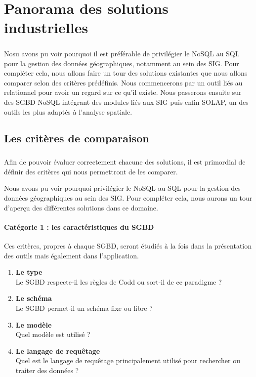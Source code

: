 \chapter{Panorama des solutions industrielles}
\paragraph{}Nosu avons pu voir pourquoi il est préférable de privilégier le NoSQL au SQL pour la gestion des données géographiques, notamment au sein des \acrshort{SIG}. Pour compléter cela, nous allons faire un tour des solutions existantes que nous allons comparer selon des critères prédéfinis. Nous commencerons par un outil liés au relationnel pour avoir un regard sur ce qu’il existe. Nous passerons ensuite sur des SGBD NoSQL intégrant des modules liés aux SIG puis enfin SOLAP, un des outils les plus adaptés à l’analyse spatiale.

\section{Les critères de comparaison}

\paragraph{}Afin de pouvoir évaluer correctement chacune des solutions, il est primordial de définir des critères qui nous permettront de les comparer.

Nous avons pu voir pourquoi privilégier le NoSQL au SQL pour la gestion des données géographiques au sein des SIG. Pour compléter cela, nous aurons un tour d’aperçu des différentes solutions dans ce domaine. 

\subsubsection{Catégorie 1 : les caractéristiques du SGBD}
Ces critères, propres à chaque SGBD, seront étudiés à la fois dans la présentation des outils mais également dans l'application.
\begin{enumerate}
    \item \textbf{Le type} \\ Le \acrshort{SGBD} respecte-il les règles de Codd ou sort-il de ce paradigme ? \newline
    \item \textbf{Le schéma} \\ Le \acrshort{SGBD} permet-il un schéma fixe ou libre ? \newline
    \item \textbf{Le modèle} \\ Quel modèle est utilisé ? \newline
    \item \textbf{Le langage de requêtage} \\ Quel est le langage de requêtage principalement utilisé pour rechercher ou traiter des données ?
\end{enumerate}

